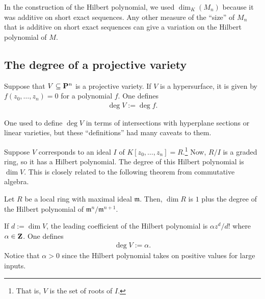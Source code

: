 \documentclass [11 pt, oneside] {article}
\begin{document}
\begin{remark}
In the construction of the Hilbert polynomial, we used $\dim_K(M_n)$ because it was additive on short exact sequences. Any other measure of the ``size'' of $M_n$ that is additive on short exact sequences can give a variation on the Hilbert polynomial of $M$.	
\end{remark}

\subsection{The degree of a projective variety}
Suppose that $V\subseteq \mathbf P^n$ is a projective variety. If $V$ is a hypersurface, it is given by $f(z_0,\hdots,z_n)=0$ for a polynomial $f$. One defines
\begin{align*}
	\deg V := \deg f.
\end{align*}

One used to define $\deg V$ in terms of intersections with hyperplane sections or linear varieties, but these ``definitions'' had many caveats to them.

Suppose $V$ corresponds to an ideal $I$ of $K[z_0,\hdots, z_n]=R$.\footnote{That is, $V$ is the set of roots of $I$.} Now, $R/I$ is a graded ring, so it has a Hilbert polynomial. The degree of this Hilbert polynomial is $\dim V$. This is closely related to the following theorem from commutative algebra.

\begin{theorem}[ ]\label{}\index{}\text{}
Let $R$ be a local ring with maximal ideal $\mathfrak{m}$. Then, $\dim R$ is $1$ plus the degree of the Hilbert polynomial of $\mathfrak{m}^n / \mathfrak{m}^{n+1}$.
\end{theorem}

If $d:=\dim V$, the leading coefficient of the Hilbert polynomial is $\alpha z^d/d!$ where $\alpha\in \mathbf Z$. One defines
\begin{align*}
	\deg V := \alpha.
\end{align*}
Notice that $\alpha>0$ since the Hilbert polynomial takes on positive values for large inputs.
\end{document}
